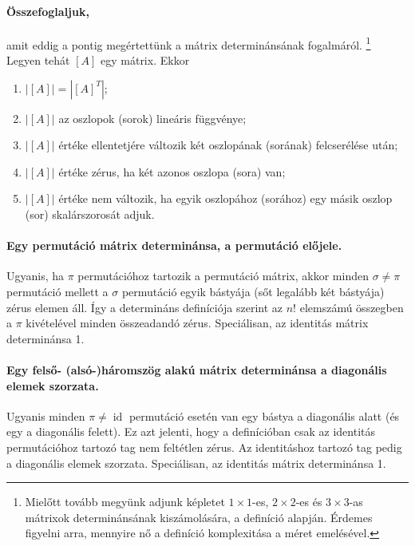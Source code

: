 \documentclass[9pt, a4paper, showtrims]{memoir}
\theoremstyle{plain}
\theoremstyle{remark}
\theoremstyle{definition}
\DeclareMathOperator{\id}{id}
\begin{document}
\paragraph{Összefoglaljuk,} amit eddig a pontig megértettünk a mátrix determinánsának fogalmáról.
\footnote{
	Mielőtt tovább megyünk adjunk képletet $1\times 1$-es,
	$2\times 2$-es és $3\times 3$-as mátrixok determinánsának kiszámolására, a definíció alapján.
	Érdemes figyelni arra, mennyire nő a definíció komplexitása a méret emelésével.
}
Legyen tehát $[A]$ egy mátrix. Ekkor
\begin{enumerate}
	\item $|[A]|=|[A]^T|$;
	\item $|[A]|$ az oszlopok (sorok) lineáris függvénye;
	\item $|[A]|$ értéke ellentetjére változik két oszlopának (sorának) felcserélése után;
	\item $|[A]|$ értéke zérus, ha két azonos oszlopa (sora) van;
	\item $|[A]|$ értéke nem változik, ha egyik oszlopához (sorához) egy másik oszlop (sor) skalárszorosát adjuk.
\end{enumerate}

\paragraph{Egy permutáció mátrix determinánsa, a permutáció előjele.}
Ugyanis, ha $\pi$ permutációhoz tartozik a permutáció mátrix, akkor minden $\sigma\neq\pi$ permutáció mellett
a $\sigma$ permutáció egyik bástyája (sőt legalább két bástyája) zérus elemen áll.
Így a determináns definíciója szerint az $n!$ elemszámú összegben a $\pi$ kivételével minden összeadandó zérus.
Speciálisan, az identitás mátrix determinánsa 1.

\paragraph{Egy felső- (alsó-)háromszög alakú mátrix determinánsa a diagonális elemek szorzata.}
Ugyanis minden $\pi\neq\id$ permutáció esetén van egy bástya a diagonális alatt (és egy a diagonális felett).
Ez azt jelenti, hogy a definícióban csak az identitás permutációhoz tartozó tag nem feltétlen zérus.
Az identitáshoz tartozó tag pedig a diagonális elemek szorzata.
Speciálisan, az identitás mátrix determinánsa 1.
\end{document}
